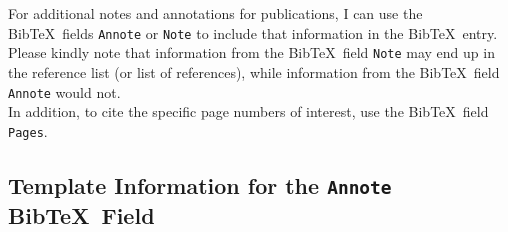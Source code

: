 \documentclass[letter,12pt]{article}
\begin{document}
For additional notes and annotations for publications, I can use the {\sc Bib}\TeX\ fields {\tt Annote} or {\tt Note} to include that information in the {\sc Bib}\TeX\ entry. Please kindly note that information from the {\sc Bib}\TeX\ field {\tt Note} may end up in the reference list (or list of references), while information from the {\sc Bib}\TeX\ field {\tt Annote} would not. \\

In addition, to cite the specific page numbers of interest, use the {\sc Bib}\TeX\ field {\tt Pages}.













\subsection{Template Information for the {\tt Annote} {\sc Bib}\TeX\ Field}
\label{ssec:TemplateInformationForTheAnnoteBibTeXField}
\end{document}
